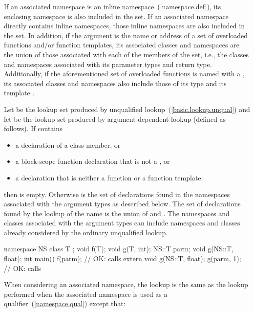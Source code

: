 If an associated namespace is an inline namespace~(\ref{namespace.def}), its
enclosing namespace is also included in the set. If an associated namespace
directly contains inline namespaces, those inline namespaces are also included
in the set.
In addition, if the argument is the name or address of a set of
overloaded functions and/or function templates, its associated classes
and namespaces are the union of those associated with each of the
members of the set, i.e., the classes and namespaces associated with its
parameter types and return type.
Additionally, if the aforementioned set of overloaded functions is named with
a , its associated classes and namespaces also include
those of its type  and its template
.

\pnum
Let  be the lookup set produced by unqualified
lookup~(\ref{basic.lookup.unqual}) and let  be the lookup set produced
by argument dependent lookup (defined as follows). If  contains
\begin{itemize}
\item a declaration of a class member, or

\item a block-scope function declaration that is not a
, or

\item a declaration that is neither a function or a function template

\end{itemize}
then  is empty. Otherwise  is the set of declarations
found in the namespaces associated with the argument types as described
below. The set of declarations found by the lookup of the name is the
union of  and . \enternote The namespaces and classes
associated with the argument types can include namespaces and classes
already considered by the ordinary unqualified lookup. \exitnote
\enterexample

\begin{codeblock}
namespace NS {
  class T { };
  void f(T);
  void g(T, int);
}
NS::T parm;
void g(NS::T, float);
int main() {
  f(parm);                      // OK: calls 
  extern void g(NS::T, float);
  g(parm, 1);                   // OK: calls 
}
\end{codeblock}
\exitexample 

\pnum
When considering an associated namespace, the lookup is the same as the
lookup performed when the associated namespace is used as a
qualifier~(\ref{namespace.qual}) except that:

